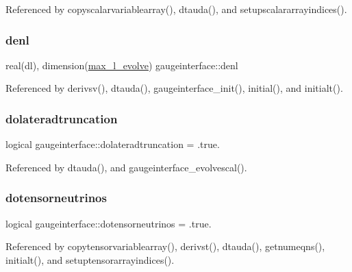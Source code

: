Referenced by copyscalarvariablearray(), dtauda(), and setupscalararrayindices().

\mbox{\label{namespacegaugeinterface_ad67d0af8f042d5a80e3890d8a794be5f}} 
\subsubsection{\texorpdfstring{denl}{denl}}
{\footnotesize\ttfamily real(dl), dimension(\mbox{\hyperlink{namespacegaugeinterface_a965f8caba9ba282e718281110e274b04}{max\+\_\+l\+\_\+evolve}}) gaugeinterface\+::denl}



Referenced by derivsv(), dtauda(), gaugeinterface\+\_\+init(), initial(), and initialt().

\mbox{\label{namespacegaugeinterface_a1c86dc449a45192d8e9e999627a3f511}} 
\subsubsection{\texorpdfstring{dolateradtruncation}{dolateradtruncation}}
{\footnotesize\ttfamily logical gaugeinterface\+::dolateradtruncation = .true.}



Referenced by dtauda(), and gaugeinterface\+\_\+evolvescal().

\mbox{\label{namespacegaugeinterface_a48d8dc2750f4cecf3337b6f6dd2d736b}} 
\subsubsection{\texorpdfstring{dotensorneutrinos}{dotensorneutrinos}}
{\footnotesize\ttfamily logical gaugeinterface\+::dotensorneutrinos = .true.}



Referenced by copytensorvariablearray(), derivst(), dtauda(), getnumeqns(), initialt(), and setuptensorarrayindices().

